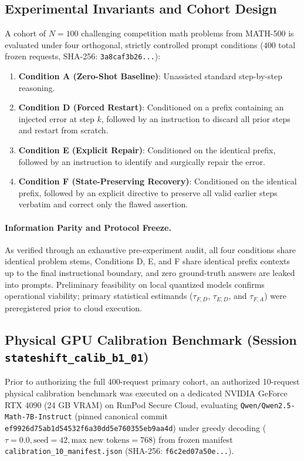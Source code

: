 \documentclass[11pt]{article}
\begin{document}
\subsection{Experimental Invariants and Cohort Design}
A cohort of $N=100$ challenging competition math problems from MATH-500 is evaluated under four orthogonal, strictly controlled prompt conditions ($400$ total frozen requests, SHA-256: \texttt{3a8caf3b26...}):
\begin{enumerate}
    \item \textbf{Condition A (Zero-Shot Baseline)}: Unassisted standard step-by-step reasoning.
    \item \textbf{Condition D (Forced Restart)}: Conditioned on a prefix containing an injected error at step $k$, followed by an instruction to discard all prior steps and restart from scratch.
    \item \textbf{Condition E (Explicit Repair)}: Conditioned on the identical prefix, followed by an instruction to identify and surgically repair the error.
    \item \textbf{Condition F (State-Preserving Recovery)}: Conditioned on the identical prefix, followed by an explicit directive to preserve all valid earlier steps verbatim and correct only the flawed assertion.
\end{enumerate}

\paragraph{Information Parity and Protocol Freeze.}
As verified through an exhaustive pre-experiment audit, all four conditions share identical problem stems, Conditions D, E, and F share identical prefix contexts up to the final instructional boundary, and zero ground-truth answers are leaked into prompts. Preliminary feasibility on local quantized models confirms operational viability; primary statistical estimands ($\tau_{F, D}$, $\tau_{E, D}$, and $\tau_{F, A}$) were preregistered prior to cloud execution.

\subsection{Physical GPU Calibration Benchmark (Session \texttt{stateshift\_calib\_b1\_01})}
Prior to authorizing the full 400-request primary cohort, an authorized 10-request physical calibration benchmark was executed on a dedicated NVIDIA GeForce RTX 4090 (24 GB VRAM) on RunPod Secure Cloud, evaluating \texttt{Qwen/Qwen2.5-Math-7B-Instruct} (pinned canonical commit \texttt{ef9926d75ab1d54532f6a30dd5e760355eb9aa4d}) under greedy decoding ($\tau = 0.0, \text{seed} = 42, \text{max new tokens} = 768$) from frozen manifest \texttt{calibration\_10\_manifest.json} (SHA-256: \texttt{f6c2ed07a50e...}).
\end{document}
